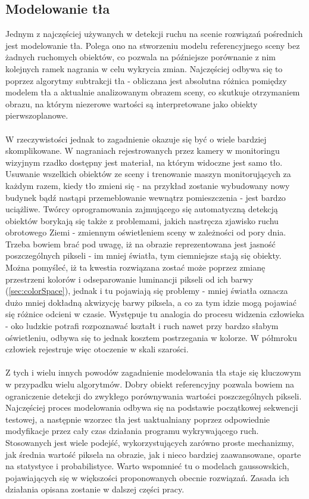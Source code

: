 \subsection{Modelowanie tła}
Jednym z najczęściej używanych w detekcji ruchu na scenie rozwiązań pośrednich jest modelowanie tła. Polega ono na stworzeniu modelu referencyjnego sceny bez żadnych ruchomych obiektów, co pozwala na późniejsze porównanie z nim kolejnych ramek nagrania w celu wykrycia zmian. Najczęściej odbywa się to poprzez algorytmy subtrakcji tła - obliczana jest absolutna różnica pomiędzy modelem tła a aktualnie analizowanym obrazem sceny, co skutkuje otrzymaniem obrazu, na którym niezerowe wartości są interpretowane jako obiekty pierwszoplanowe.
\paragraph{}
W rzeczywistości jednak to zagadnienie okazuje się być o wiele bardziej skomplikowane. W nagraniach rejestrowanych przez kamery w monitoringu wizyjnym rzadko dostępny jest materiał, na którym widoczne jest samo tło. Usuwanie wszelkich obiektów ze sceny i trenowanie maszyn monitorujących za każdym razem, kiedy tło zmieni się - na przykład zostanie wybudowany nowy budynek bądź nastąpi przemeblowanie wewnątrz pomieszczenia - jest bardzo uciążliwe. Twórcy oprogramowania zajmującego się automatyczną detekcją obiektów borykają się także z problemami, jakich nastręcza zjawisko ruchu obrotowego Ziemi - zmiennym oświetleniem sceny w zależności od pory dnia. Trzeba bowiem brać pod uwagę, iż na obrazie reprezentowana jest jasność poszczególnych pikseli - im mniej światła, tym ciemniejsze stają się obiekty. Można pomyśleć, iż ta kwestia rozwiązana zostać może poprzez zmianę przestrzeni kolorów i odseparowanie luminancji pikseli od ich barwy (\ref{sec:colorSpace}), jednak i tu pojawiają się problemy - mniej światła oznacza dużo mniej dokładną akwizycję barwy piksela, a co za tym idzie mogą pojawiać się różnice odcieni w czasie. Występuje tu analogia do procesu widzenia człowieka - oko ludzkie potrafi rozpoznawać kształt i ruch nawet przy bardzo słabym oświetleniu, odbywa się to jednak kosztem postrzegania w kolorze. W półmroku człowiek rejestruje więc otoczenie w skali szarości.
\paragraph{}
Z tych i wielu innych powodów zagadnienie modelowania tła staje się kluczowym w przypadku wielu algorytmów. Dobry obiekt referencyjny pozwala bowiem na ograniczenie detekcji do zwykłego porównywania wartości poszczególnych pikseli. Najczęściej proces modelowania odbywa się na podstawie początkowej sekwencji testowej, a następnie wzorzec tła jest uaktualniany poprzez odpowiednie modyfikacje przez cały czas działania programu wykrywającego ruch. Stosowanych jest wiele podejść, wykorzystujących zarówno proste mechanizmy, jak średnia wartość piksela na obrazie, jak i nieco bardziej zaawansowane, oparte na statystyce i probabilistyce. Warto wspomnieć tu o modelach gaussowskich, pojawiających się w większości proponowanych obecnie rozwiązań. Zasada ich działania opisana zostanie w dalszej części pracy.
